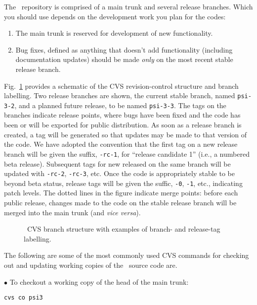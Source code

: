 The \PSIthree\ repository is comprised of a main trunk and several
release branches.  Which you should use depends on the development
work you plan for the codes:
\begin{enumerate}
\item The main trunk is reserved for development of new functionality.
\item Bug fixes, defined as anything that doesn't add functionality
(including documentation updates) should be made {\em only} on the most
recent stable release branch.
\end{enumerate}

\noindent Fig.~\ref{Fig:cvs} provides a schematic of the CVS revision-control
structure and branch labelling.  Two release branches are shown, the current
stable branch, named {\tt psi-3-2}, and a planned future release, to be
named {\tt psi-3-3}.  The tags on the branches indicate release points,
where bugs have been fixed and the code has been or will be exported for
public distribution.  As soon as a release branch is created, a tag will
be generated so that updates may be made to that version of the code.
We have adopted the convention that the first tag on a new release branch
will be given the suffix, {\tt -rc-1}, for ``release candidate 1'' (i.e.,
a numbered beta release).  Subsequent tags for new released on the same
branch will be updated with {\tt -rc-2}, {\tt -rc-3}, etc.  Once the
code is appropriately stable to be beyond beta status, release tags will
be given the suffic, {\tt -0}, {\tt -1}, etc., indicating patch levels.
The dotted lines in the figure indicate merge points: before each public
release, changes made to the code on the stable release branch will be
merged into the main trunk (and {\em vice versa}).

\begin{figure}[h]
\begin{center}
\end{center}
\caption{\PSIthree\ CVS branch structure with examples of branch- and
release-tag labelling.}
\label{Fig:cvs}
\end{figure}

\noindent
The following are some of the most commonly used CVS commands for checking
out and updating working copies of the \PSIthree\ source code are.

\noindent
$\bullet$ To checkout a working copy of the head of the main trunk:

{\tt cvs co psi3} 

